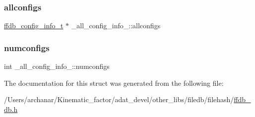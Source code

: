 \subsubsection{\texorpdfstring{allconfigs}{allconfigs}}
{\footnotesize\ttfamily \mbox{\hyperlink{other__libs_2filedb_2filehash_2ffdb__db_8h_acc961fbd2faf6a849a1620309100fda1}{ffdb\+\_\+config\+\_\+info\+\_\+t}} $\ast$ \+\_\+all\+\_\+config\+\_\+info\+\_\+\+::allconfigs}

\mbox{\label{struct__all__config__info___a581857c25b21cf9e4b7f87396aefca30}} 
\subsubsection{\texorpdfstring{numconfigs}{numconfigs}}
{\footnotesize\ttfamily int \+\_\+all\+\_\+config\+\_\+info\+\_\+\+::numconfigs}



The documentation for this struct was generated from the following file\+:\begin{DoxyCompactItemize}
\item 
/\+Users/archanar/\+Kinematic\+\_\+factor/adat\+\_\+devel/other\+\_\+libs/filedb/filehash/\mbox{\hyperlink{other__libs_2filedb_2filehash_2ffdb__db_8h}{ffdb\+\_\+db.\+h}}\end{DoxyCompactItemize}

